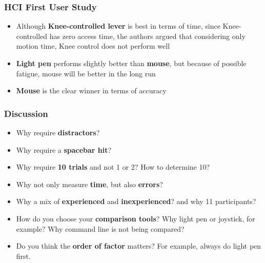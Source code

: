 \documentclass{beamer}
\begin{document}
\begin{frame}
\frametitle{HCI First User Study}
\begin{itemize}
	\item Although \textbf{Knee-controlled lever} is best in terms of time, since Knee-controlled has zero access time, the authors argued that considering only motion time, Knee control does not perform well
	\item \textbf{Light pen} performs slightly better than \textbf{mouse}, but because of possible fatigue, mouse will be better in the long run
	\item \textbf{Mouse} is the clear winner in terms of accuracy
\end{itemize}
\end{frame}

\begin{frame}
\frametitle{Discussion}
\begin{itemize}
	\item Why require \textbf{distractors}?
	\item Why require a \textbf{spacebar hit}?
	\item Why require \textbf{10 trials} and not 1 or 2?  How to determine 10?
	\item Why not only measure \textbf{time},  but also \textbf{errors}?
	\item Why a mix of \textbf{experienced} and \textbf{inexperienced}?  and why 11 participants?
	\item How do you choose your \textbf{comparison tools}?  Why light pen or joystick,  for example?  Why command line is not being compared?
	\item Do you think the \textbf{order of factor }matters?  For example,  always do light pen first.
\end{itemize}
\end{frame}

\end{document}
